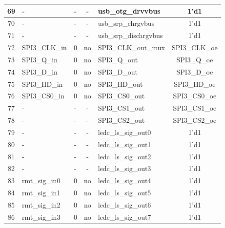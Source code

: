 \begin{longtable}[c]{|c|l|c|c|l|c|}
 69  &                        -  &  -  &    -  &       usb\_otg\_drvvbus  &               1'd1  \\\hline
 70  &                        -  &  -  &    -  &      usb\_srp\_chrgvbus  &               1'd1  \\\hline
 71  &                        -  &  -  &    -  &   usb\_srp\_dischrgvbus  &               1'd1  \\\hline
 72  &            SPI3\_CLK\_in  &  0  &   no  &     SPI3\_CLK\_out\_mux  &      SPI3\_CLK\_oe  \\\hline
 73  &              SPI3\_Q\_in  &  0  &   no  &            SPI3\_Q\_out  &        SPI3\_Q\_oe  \\\hline
 74  &              SPI3\_D\_in  &  0  &   no  &            SPI3\_D\_out  &        SPI3\_D\_oe  \\\hline
 75  &             SPI3\_HD\_in  &  0  &   no  &           SPI3\_HD\_out  &       SPI3\_HD\_oe  \\\hline
 76  &            SPI3\_CS0\_in  &  0  &   no  &          SPI3\_CS0\_out  &      SPI3\_CS0\_oe  \\\hline
 77  &                        -  &  -  &    -  &          SPI3\_CS1\_out  &      SPI3\_CS1\_oe  \\\hline
 78  &                        -  &  -  &    -  &          SPI3\_CS2\_out  &      SPI3\_CS2\_oe  \\\hline
 79  &                        -  &  -  &    -  &     ledc\_ls\_sig\_out0  &               1'd1  \\\hline
 80  &                        -  &  -  &    -  &     ledc\_ls\_sig\_out1  &               1'd1  \\\hline
 81  &                        -  &  -  &    -  &     ledc\_ls\_sig\_out2  &               1'd1  \\\hline
 82  &                        -  &  -  &    -  &     ledc\_ls\_sig\_out3  &               1'd1  \\\hline
 83  &            rmt\_sig\_in0  &  0  &   no  &     ledc\_ls\_sig\_out4  &               1'd1  \\\hline
 84  &            rmt\_sig\_in1  &  0  &   no  &     ledc\_ls\_sig\_out5  &               1'd1  \\\hline
 85  &            rmt\_sig\_in2  &  0  &   no  &     ledc\_ls\_sig\_out6  &               1'd1  \\\hline
 86  &            rmt\_sig\_in3  &  0  &   no  &     ledc\_ls\_sig\_out7  &               1'd1  \\\hline

\end{longtable}
